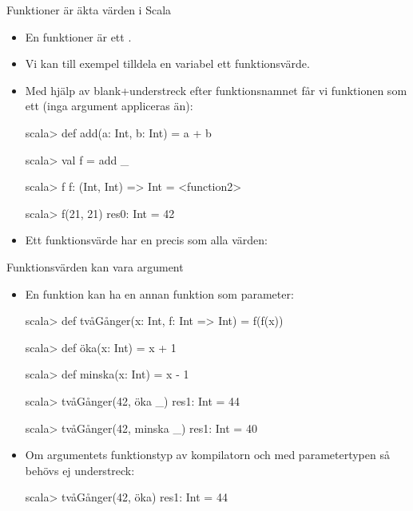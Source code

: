 \begin{Slide}{Funktioner är äkta värden i Scala}\SlideFontSmall
\begin{itemize}
\item En funktioner är ett .
\item Vi kan till exempel tilldela en variabel ett funktionsvärde.
\pause
\item Med hjälp av blank+understreck efter funktionsnamnet får vi funktionen som ett  (inga argument appliceras än):
\begin{REPLnonum}
scala> def add(a: Int, b: Int) = a + b

scala> val f = add _

scala> f
f: (Int, Int) => Int = <function2>

scala> f(21, 21)
res0: Int = 42
\end{REPLnonum}

\item Ett funktionsvärde har en  precis som alla värden: \\
\end{itemize}
\end{Slide}

\begin{Slide}{Funktionsvärden kan vara argument}
\begin{itemize}
\item En funktion kan ha en annan funktion som parameter:
\begin{REPL}
scala> def tvåGånger(x: Int, f: Int => Int) = f(f(x))

scala> def öka(x: Int) = x + 1

scala> def minska(x: Int) = x - 1

scala> tvåGånger(42, öka _)
res1: Int = 44

scala> tvåGånger(42, minska _)
res1: Int = 40
\end{REPL}

\item Om argumentets funktionstyp  av kompilatorn och  med parametertypen så behövs ej understreck: \\
\begin{REPL}
scala> tvåGånger(42, öka)
res1: Int = 44
\end{REPL}\end{itemize}
\end{Slide}



